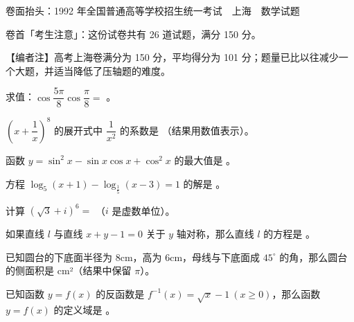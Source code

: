 

\begin{gktip}
卷面抬头：1992 年全国普通高等学校招生统一考试　上海　数学试题

卷首「考生注意」：这份试卷共有 26 道试题，满分 150 分。

【编者注】高考上海卷满分为 150 分，平均得分为 101 分；题量已比以往减少一个大题，并适当降低了压轴题的难度。
\end{gktip}


\begin{question}
求值：$\cos\dfrac{5\pi}{8}\cos\dfrac{\pi}{8}=$ \gkblank{}。

\end{question}
\begin{question}
$\left(x+\dfrac{1}{x}\right)^{8}$ 的展开式中 $\dfrac{1}{x^{2}}$ 的系数是 \gkblank{}（结果用数值表示）。

\end{question}
\begin{question}
函数 $y=\sin^{2}x-\sin x\cos x+\cos^{2}x$ 的最大值是 \gkblank{}。

\end{question}
\begin{question}
方程 $\log_{5}(x+1)-\log_{\frac{1}{5}}(x-3)=1$ 的解是 \gkblank{}。

\end{question}
\begin{question}
计算 $(\sqrt{3}+i)^{6}=$ \gkblank{}（$i$ 是虚数单位）。

\end{question}
\begin{question}
如果直线 $l$ 与直线 $x+y-1=0$ 关于 $y$ 轴对称，那么直线 $l$ 的方程是 \gkblank{}。

\end{question}
\begin{question}
已知圆台的下底面半径为 8cm，高为 6cm，母线与下底面成 $45^{\circ}$ 的角，那么圆台的侧面积是 \gkblank{} cm²（结果中保留 $\pi$）。

\end{question}
\begin{question}
已知函数 $y=f(x)$ 的反函数是 $f^{-1}(x)=\sqrt{x}-1\ (x\ge 0)$，那么函数 $y=f(x)$ 的定义域是 \gkblank{}。

\end{question}
